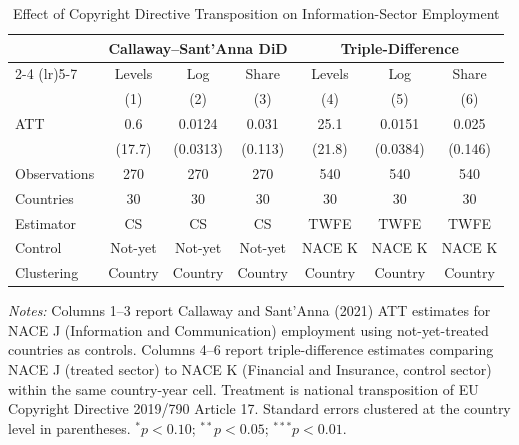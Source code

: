 \begin{table}[htbp]
\centering
\caption{Effect of Copyright Directive Transposition on Information-Sector Employment}
\label{tab:main}
\begin{threeparttable}
\small
\begin{tabular}{lcccccc}
\hline\hline
 & \multicolumn{3}{c}{Callaway--Sant'Anna DiD} & \multicolumn{3}{c}{Triple-Difference} \\
\cmidrule(lr){2-4} \cmidrule(lr){5-7}
 & Levels & Log & Share & Levels & Log & Share \\
 & (1) & (2) & (3) & (4) & (5) & (6) \\
\hline
ATT & 0.6 & 0.0124 & 0.031 & 25.1 & 0.0151 & 0.025 \\
 & (17.7) & (0.0313) & (0.113) & (21.8) & (0.0384) & (0.146) \\
\hline
Observations & 270 & 270 & 270 & 540 & 540 & 540 \\
Countries & 30 & 30 & 30 & 30 & 30 & 30 \\
Estimator & CS & CS & CS & TWFE & TWFE & TWFE \\
Control & Not-yet & Not-yet & Not-yet & NACE K & NACE K & NACE K \\
Clustering & Country & Country & Country & Country & Country & Country \\
\hline\hline
\end{tabular}
\begin{tablenotes}[flushleft]\small
\item \textit{Notes:} Columns 1--3 report Callaway and Sant'Anna (2021) ATT estimates for NACE J (Information and Communication) employment using not-yet-treated countries as controls. Columns 4--6 report triple-difference estimates comparing NACE J (treated sector) to NACE K (Financial and Insurance, control sector) within the same country-year cell. Treatment is national transposition of EU Copyright Directive 2019/790 Article 17. Standard errors clustered at the country level in parentheses. $^{*}p<0.10$; $^{**}p<0.05$; $^{***}p<0.01$.
\end{tablenotes}
\end{threeparttable}
\end{table}
